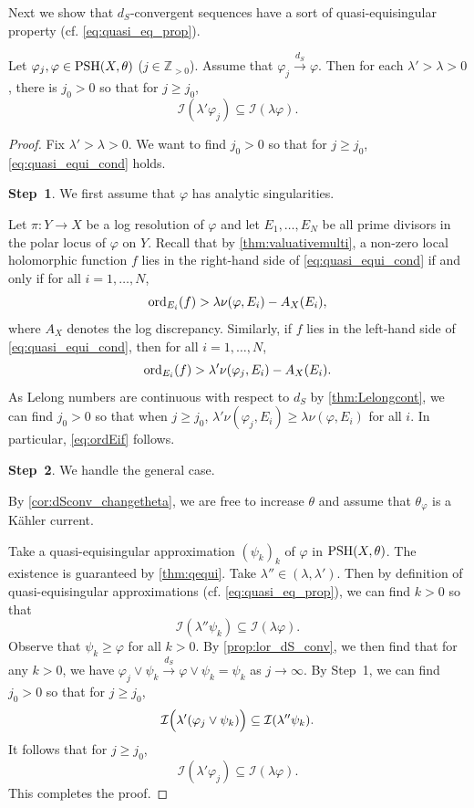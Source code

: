 Next we show that $d_S$-convergent sequences have a sort of quasi-equisingular property (cf. \eqref{eq:quasi_eq_prop}).
\begin{theorem}\label{thm:equising_cond_general}
    Let $\varphi_j,\varphi\in \mathrm{PSH}(X,\theta)$ ($j\in \mathbb{Z}_{>0}$). Assume that $\varphi_j\xrightarrow{d_S}\varphi$. Then for each $\lambda'>\lambda>0$, there is $j_0>0$ so that for $j\geq j_0$,
    \begin{equation}\label{eq:quasi_equi_cond}
        \mathcal{I}(\lambda' \varphi_j)\subseteq \mathcal{I}(\lambda \varphi).
    \end{equation}
\end{theorem}
\begin{proof}
Fix $\lambda'>\lambda>0$. We want to find $j_0>0$ so that for $j\geq j_0$, \eqref{eq:quasi_equi_cond} holds.

\textbf{Step~1}. We first assume that $\varphi$ has analytic singularities.

Let $\pi\colon Y\rightarrow X$ be a log resolution of $\varphi$ and let $E_1,\ldots,E_N$ be all prime divisors in the polar locus of $\varphi$ on $Y$.
Recall that by \cref{thm:valuativemulti}, a non-zero local holomorphic function $f$ lies in the right-hand side of \eqref{eq:quasi_equi_cond} if and only if for all $i=1,\ldots,N$,
\begin{equation}\label{eq:ordEif}
\operatorname{ord}_{E_i}(f)>\lambda \nu(\varphi,E_i)-A_X(E_i),
\end{equation}
where $A_X$ denotes the log discrepancy.
Similarly, if $f$ lies in the left-hand side of \eqref{eq:quasi_equi_cond}, then for all $i=1,\ldots,N$,
\[
\operatorname{ord}_{E_i}(f)> \lambda'\nu(\varphi_j,E_i)-A_X(E_i).
\]
As Lelong numbers are continuous with respect to $d_S$ by \cref{thm:Lelongcont}, we can find $j_0>0$ so that when $j\geq j_0$, $\lambda'\nu(\varphi_j,E_i)\geq \lambda \nu(\varphi,E_i)$ for all $i$. In particular, \eqref{eq:ordEif} follows.

\textbf{Step~2}. We handle the general case.

By \cref{cor:dSconv_changetheta}, we are free to increase $\theta$ and assume that $\theta_{\varphi}$ is a Kähler current.

Take a quasi-equisingular approximation $(\psi_k)_k$ of $\varphi$ in $\mathrm{PSH}(X,\theta)$. The existence is guaranteed by \cref{thm:qequi}.
Take $\lambda''\in (\lambda,\lambda')$. Then by definition of quasi-equisingular approximations (cf. \eqref{eq:quasi_eq_prop}), we can find $k>0$ so that
\[
    \mathcal{I}(\lambda''\psi_k)\subseteq \mathcal{I}(\lambda \varphi).
\]
Observe that $\psi_k\geq \varphi$ for all $k>0$. By \cref{prop:lor_dS_conv}, we then find that for any $k>0$, we have $\varphi_j\lor \psi_k\xrightarrow{d_S}\varphi\lor \psi_k=\psi_k$ as $j\to\infty$.
By Step~1, we can find $j_0>0$ so that for $j\geq j_0$,
\[
    \mathcal{I}\Bigl(\lambda' (\varphi_j\lor \psi_k)\Bigr)\subseteq \mathcal{I}(\lambda''\psi_k).
\]
It follows that for $j\geq j_0$,
\[
    \mathcal{I}(\lambda' \varphi_j)\subseteq  \mathcal{I}(\lambda \varphi).
\]
This completes the proof.
\end{proof}
